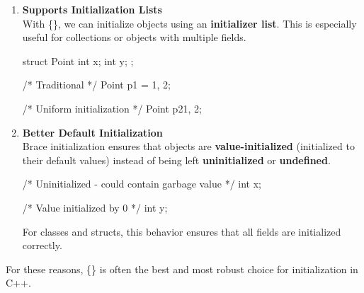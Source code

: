 \documentclass[../main]{subfiles}
\begin{document}
\begin{enumerate}
\item \textbf{Supports Initialization Lists} \\
With \{\}, we can initialize objects using an \textbf{initializer list}. This is especially useful for collections or objects with multiple fields.

\begin{Code}
    struct Point {
        int x;
        int y;
    };

    /* Traditional */
    Point p1 = {1, 2};

    /* Uniform initialization */
    Point p2{1, 2};     
\end{Code}

\item \textbf{Better Default Initialization} \\
Brace initialization ensures that objects are \textbf{value-initialized} (initialized to their default values) instead of being left \textbf{uninitialized} or \textbf{undefined}.

\begin{Code}
    /* Uninitialized - could contain garbage value */
    int x;

    /* Value initialized by 0 */
    int y{};
\end{Code}

For classes and structs, this behavior ensures that all fields are initialized correctly.
\end{enumerate}

For these reasons, \{\} is often the best and most robust choice for initialization in C++.
\end{document}

